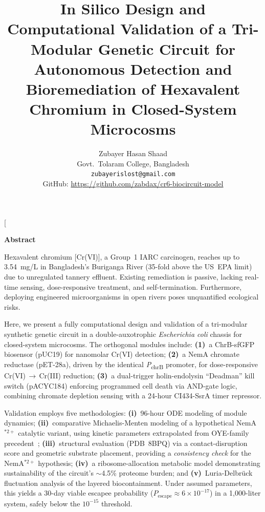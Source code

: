 \documentclass[10pt,twocolumn,letterpaper,
              colorlinks=true,
              linkcolor=blue!70!black,
              citecolor=blue!70!black,
              urlcolor=blue!70!black,
              pdfborder={0 0 0}]{article}
\title{\Large\bfseries
  In Silico Design and Computational Validation of a
  Tri-Modular Genetic Circuit for Autonomous Detection
  and Bioremediation of Hexavalent Chromium in
  Closed-System Microcosms}
\author{%
{\Large Zubayer Hasan Shaad}%
\hspace{0.08em}\raisebox{0.75ex}{\scalebox{0.82}{\orcidlink{0009-0002-2322-8553}}}

\vspace{0.8em}

{\normalsize Govt.\ Tolaram College, Bangladesh}

\vspace{0.35em}

{\small\texttt{zubayerislost@gmail.com}}

{\small
GitHub: \url{https://github.com/zabdax/cr6-biocircuit-model}
}
\vspace{0.35em}
}
\begin{document}

\twocolumn[%
  \maketitle
  \vspace{-0.6em}
  \begin{center}
    \large\bfseries Abstract
  \end{center}
  \vspace{-0.3em}
  \noindent
  Hexavalent chromium {[Cr(VI)]}, a Group~1 IARC carcinogen, reaches up to
  3.54~mg/L in Bangladesh's Buriganga River (35-fold above the US~EPA 
  limit) due to unregulated tannery effluent. Existing remediation is passive, 
  lacking real-time sensing, dose-responsive treatment, and self-termination. 
  Furthermore, deploying engineered microorganisms in open rivers poses 
  unquantified ecological risks.

  \medskip\noindent
  Here, we present a fully computational design and validation of a
  tri-modular synthetic genetic circuit in a double-auxotrophic
  \textit{Escherichia coli} chassis for closed-system microcosms. The
  orthogonal modules include: \textbf{(1)}~a ChrB-sfGFP biosensor (pUC19)
  for nanomolar Cr(VI) detection; \textbf{(2)}~a NemA chromate reductase
  (pET-28a), driven by the identical \textit{P}\textsubscript{chrB} promoter, for
  dose-responsive Cr(VI)\,$\rightarrow$\,Cr(III) reduction; \textbf{(3)}~a 
  dual-trigger holin-endolysin ``Deadman'' kill switch (pACYC184) enforcing 
  programmed cell death via AND-gate logic, combining chromate depletion 
  sensing with a 24-hour CI434-SsrA timer repressor.

  \medskip\noindent
  Validation employs five methodologies: \textbf{(i)}~96-hour ODE modeling of
  module dynamics; \textbf{(ii)}~comparative Michaelis-Menten modeling of a
  hypothetical NemA$^{*2+}$ catalytic variant, using kinetic parameters
  extrapolated from OYE-family precedent~\cite{mowafy2010}; \textbf{(iii)}~structural
  evaluation (PDB~8BPQ) via a contact-disruption score and geometric
  substrate placement, providing a \textit{consistency check} for the NemA$^{*2+}$ 
  hypothesis; \textbf{(iv)}~a ribosome-allocation metabolic model demonstrating
  sustainability of the circuit's $\sim$4.5\% proteome burden; and
  \textbf{(v)}~Luria-Delbr\"{u}ck fluctuation analysis of the layered biocontainment.
  Under assumed parameters, this yields a 30-day viable escapee probability
  ($P_{\text{escape}} \approx 6 \times 10^{-17}$) in a 1{,}000-liter system,
  safely below the $10^{-15}$ threshold.
\end{document}
